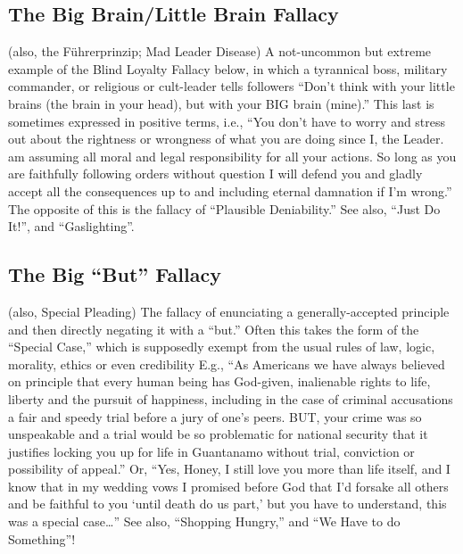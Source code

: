 \documentclass[10pt,a4paper,british]{article}
\begin{document}
\begin{multicols}{2}
	\subsection{The Big Brain/Little Brain Fallacy} (also, the Führerprinzip; Mad Leader Disease) A not{-}uncommon but extreme example of the Blind Loyalty Fallacy below, in which a tyrannical boss, military commander, or religious or cult{-}leader tells followers ``Don't think with your little brains (the brain in your head), but with your BIG brain (mine).'' This last is sometimes expressed in positive terms, i.e., ``You don't have to worry and stress out about the rightness or wrongness of what you are doing since I, the Leader. am assuming all moral and legal responsibility for all your actions. So long as you are faithfully following orders without question I will defend you and gladly accept all the consequences up to and including eternal damnation if I'm wrong.'' The opposite of this is the fallacy of ``Plausible Deniability.'' See also, ``Just Do It!'', and ``Gaslighting''.  

	\subsection{The Big ``But'' Fallacy} (also, Special Pleading)  The fallacy of enunciating a generally{-}accepted principle and then directly negating it with a ``but.'' Often this takes the form of the ``Special Case,'' which is supposedly exempt from the usual rules of law, logic, morality, ethics or even credibility  E.g., ``As Americans we have always believed on principle that every human being has God{-}given, inalienable rights to life, liberty and the pursuit of happiness, including in the case of criminal accusations a fair and speedy trial before a jury of one's peers.  BUT, your crime was so unspeakable and a trial would be so problematic for national security that it justifies locking you up for life in Guantanamo without trial, conviction or possibility of appeal.''  Or, ``Yes, Honey, I still love you more than life itself, and I know that in my wedding vows I promised before God that I'd forsake all others and be faithful to you `until death do us part,' but you have to understand, this was a special case\ldots''  See also, ``Shopping Hungry,'' and ``We Have to do Something''!  


\end{multicols}
\end{document}
